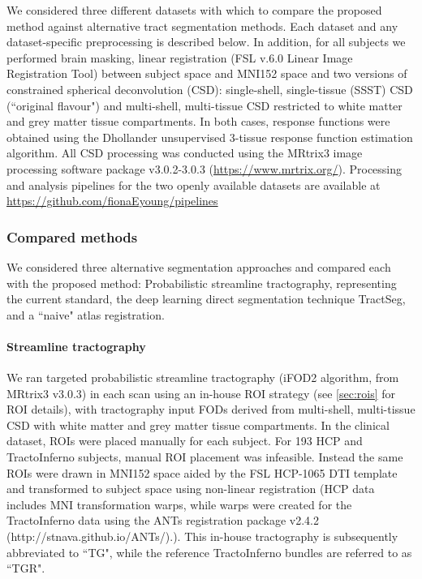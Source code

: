 We considered three different datasets with which to compare the proposed method against alternative tract segmentation methods.
Each dataset and any dataset-specific preprocessing is described below. 
In addition, for all subjects we performed brain masking,\autocite{Tournier2019} linear registration\autocite{Jenkinson2001,Jenkinson2002} (FSL v.6.0 Linear Image Registration Tool) between subject space and MNI152\autocite{Fonov2011} space and two versions of constrained spherical deconvolution (CSD): single-shell, single-tissue (SSST) CSD (``original flavour")\autocite{Tournier2007,Tournier2019} and multi-shell, multi-tissue CSD\autocite{Jeurissen2014} restricted to white matter and grey matter tissue compartments.
In both cases, response functions were obtained using the Dhollander unsupervised 3-tissue response function estimation algorithm.\autocite{Dhollander2016,Dhollander2019}
All CSD processing was conducted using the MRtrix3 image processing software package v3.0.2-3.0.3 (\url{https://www.mrtrix.org/}).\autocite{Tournier2019}
Processing and analysis pipelines for the two openly available datasets are available at \url{https://github.com/fionaEyoung/pipelines}

\subsubsection{Compared methods}

We considered three alternative segmentation approaches and compared each with the proposed method: Probabilistic streamline tractography, representing the current standard, the deep learning direct segmentation technique TractSeg, and a ``naive" atlas registration.

\paragraph{Streamline tractography}

We ran targeted probabilistic streamline tractography (iFOD2 algorithm\autocite{Tournier2010}, from MRtrix3\autocite{Tournier2019} v3.0.3) in each scan using an in-house ROI strategy (see \ref{sec:rois} for ROI details), with tractography input FODs derived from multi-shell, multi-tissue CSD \autocite{Jeurissen2014} with white matter and grey matter tissue compartments.
In the clinical dataset, ROIs were placed manually for each subject.
For 193 HCP and TractoInferno subjects, manual ROI placement was infeasible.
Instead the same ROIs were drawn in MNI152 space aided by the FSL HCP-1065 DTI template\autocite{FSLATLAS} and transformed to subject space using non-linear registration (HCP data includes MNI transformation warps, while warps were created for the TractoInferno data using the ANTs registration package v2.4.2 (http://stnava.github.io/ANTs/).\autocite{Tustison2013,Avants2011}).
This in-house tractography is subsequently abbreviated to ``TG", while the reference TractoInferno bundles are referred to as ``TGR".

